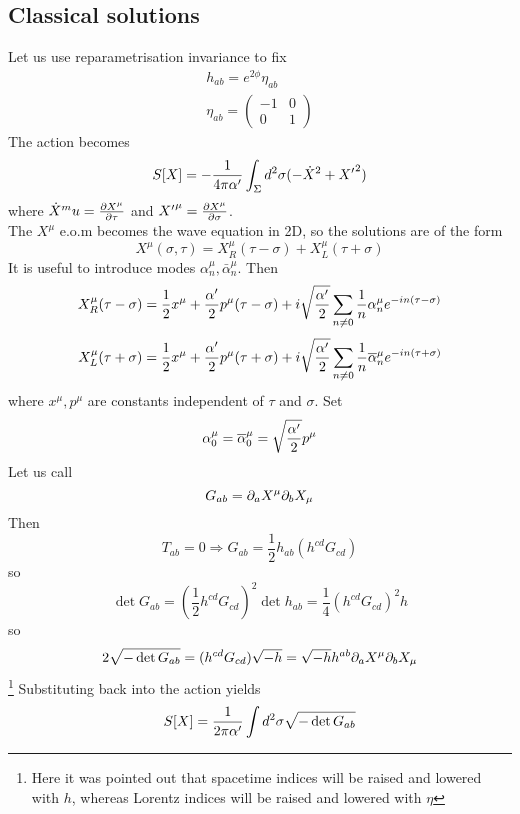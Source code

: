 \documentclass{article}
\begin{document}
\subsection{Classical solutions}
Let us use reparametrisation invariance to fix 
\begin{align*}
    h_{ab} = e^{2\phi} \eta_{ab} \\
    \eta_{ab} = \begin{pmatrix} -1 & 0 \\ 0 & 1 \end{pmatrix}
\end{align*}
The action becomes 
\[
S[X] = -\frac{1}{4\pi\cst} \int_\Sigma d^2\sigma ( -\dot{X}^2 + {X^\prime}^2 ) 
\]
where $\dot{X}^mu = \pd[X^\mu]{\tau}$ and ${X^\prime}^\mu = \pd[X^\mu]{\sigma}$. \\
The $X^\mu$ e.o.m becomes the wave equation in 2D, so the solutions are of the form 
\[
X^\mu(\sigma,\tau) = X^\mu_R(\tau-\sigma) + X^\mu_L(\tau+\sigma)
\]
It is useful to introduce modes $\alpha^\mu_n, \bar{\alpha}^\mu_n$. Then 
\[
X^\mu_R(\tau-\sigma) = \frac{1}{2} x^\mu + \frac{\cst}{2} p^\mu (\tau-\sigma) + i\sqrt{\frac{\cst}{2}} \sum_{n\neq0} \frac{1}{n} \alpha^\mu_n e^{-in(\tau-\sigma)}
\]
\[
X^\mu_L(\tau+\sigma) = \frac{1}{2} x^\mu + \frac{\cst}{2} p^\mu (\tau+\sigma) + i\sqrt{\frac{\cst}{2}} \sum_{n\neq0} \frac{1}{n} \bar{\alpha}^\mu_n e^{-in(\tau+\sigma)}
\]
where $x^\mu, p^\mu$ are constants independent of $\tau$ and $\sigma$. Set 
\[
\alpha^\mu_0 = \bar{\alpha}^\mu_0 = \sqrt{\frac{\cst}{2}} p^\mu
\]
Let us call 
\[
G_{ab} = \del_a X^\mu \del_b X_\mu
\]
Then 
\[
T_{ab}=0 \Rightarrow G_{ab}=\frac{1}{2} h_{ab} (h^{cd}G_{cd})
\]
so 
\[
\det G_{ab} = \left(\frac{1}{2}h^{cd}G_{cd} \right)^2 \det h_{ab} = \frac{1}{4}(h^{cd}G_{cd})^2 h
\]
so 
\[
2\sqrt{-\det G_{ab}} = (h^{cd}G_{cd}) \sqrt{-h} = \sqrt{-h} h^{ab} \del_a X^\mu \del_b X_\mu
\]\footnote{Here it was pointed out that spacetime indices will be raised and lowered with $h$, whereas Lorentz indices will be raised and lowered with $\eta$}
Substituting back into the action yields 
\[
S[X] = \frac{1}{2\pi\cst}\int d^2\sigma \sqrt{-\det G_{ab}}
\]

\end{document}
